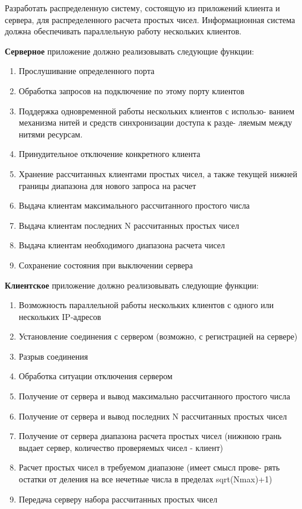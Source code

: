 \documentclass[a4paper,14pt]{extarticle}
\begin{document}
Разработать распределенную систему, состоящую из приложений клиента и сервера, для распределенного расчета простых чисел.
Информационная система должна обеспечивать параллельную работу нескольких клиентов.

\textbf{Серверное} приложение должно реализовывать следующие функции:
\begin{enumerate}
\item Прослушивание определенного порта
\item  Обработка запросов на подключение по этому порту клиентов
\item Поддержка одновременной работы нескольких клиентов с использо-
ванием механизма нитей и средств синхронизации доступа к разде-
ляемым между нитями ресурсам.
\item Принудительное отключение конкретного клиента
\item Хранение рассчитанных клиентами простых чисел, а также текущей
нижней границы диапазона для нового запроса на расчет
\item  Выдача клиентам максимального рассчитанного простого числа
\item Выдача клиентам последних N рассчитанных простых чисел
\item Выдача клиентам необходимого диапазона расчета чисел
\item Сохранение состояния при выключении сервера
\end{enumerate}

\textbf{Клиентское} приложение должно реализовывать следующие функции:
\begin{enumerate}
\item Возможность параллельной работы нескольких клиентов с одного
или нескольких IP-адресов
\item Установление соединения с сервером (возможно, с регистрацией на
сервере)
\item Разрыв соединения
\item Обработка ситуации отключения сервером
\item Получение от сервера и вывод максимально рассчитанного простого
числа
\item Получение от сервера и вывод последних N рассчитанных простых
чисел
\item Получение от сервера диапазона расчета простых чисел (нижнюю
грань выдает сервер, количество проверяемых чисел - клиент)
\item Расчет простых чисел в требуемом диапазоне (имеет смысл прове-
рять остатки от деления на все нечетные числа в пределах
sqrt(Nmax)+1)
\item Передача серверу набора рассчитанных простых чисел
\end{enumerate}
\end{document}
